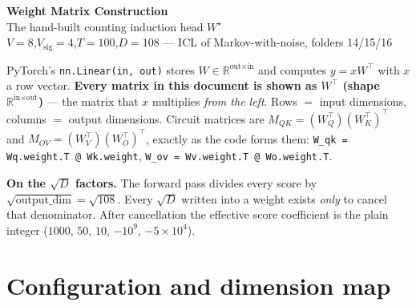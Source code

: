 \documentclass[11pt]{article}
\newcommand{\R}{\mathbb{R}}
\newcommand{\Wq}{W_Q}
\newcommand{\Wk}{W_K}
\newcommand{\Wv}{W_V}
\newcommand{\Wo}{W_O}
\newcommand{\sd}{\sqrt{D}}
\begin{document}
\begin{center}
{\LARGE\bfseries Weight Matrix Construction}\\[0.4em]
{\large The hand-built counting induction head $W^\star$}\\[0.3em]
{\normalsize $V=8$,\quad $V_{\mathrm{sig}}=4$,\quad $T=100$,\quad $D=108$ \quad---\quad
ICL of Markov-with-noise, folders 14/15/16}
\end{center}
\vspace{0.6em}

\begin{conventionbox}
PyTorch's \texttt{nn.Linear(in, out)} stores $W\in\R^{\text{out}\times\text{in}}$ and computes
$y=xW^\top$ with $x$ a row vector. \textbf{Every matrix in this document is shown as $W^\top$
(shape $\R^{\text{in}\times\text{out}}$)} --- the matrix that $x$ multiplies \emph{from the left}.
Rows $=$ input dimensions, columns $=$ output dimensions. Circuit matrices are
$M_{QK}=(\Wq^\top)(\Wk^\top)^\top$ and $M_{OV}=(\Wv^\top)(\Wo^\top)^\top$, exactly as the code
forms them: \texttt{W\_qk = Wq.weight.T @ Wk.weight}, \texttt{W\_ov = Wv.weight.T @ Wo.weight.T}.

\medskip
\textbf{On the $\sd$ factors.} The forward pass divides every score by
$\sqrt{\text{output\_dim}}=\sqrt{108}$. Every $\sd$ written into a weight exists \emph{only} to
cancel that denominator. After cancellation the effective score coefficient is the plain integer
($1000$, $50$, $10$, $-10^9$, $-5\times10^4$).
\end{conventionbox}

\tableofcontents
\newpage

\section{Configuration and dimension map}
\end{document}
